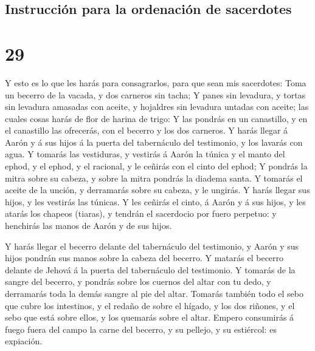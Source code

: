 \hypertarget{instrucciuxf3n-para-la-ordenaciuxf3n-de-sacerdotes}{%
\subsection{Instrucción para la ordenación de
sacerdotes}\label{instrucciuxf3n-para-la-ordenaciuxf3n-de-sacerdotes}}

\hypertarget{section-02-29}{%
\section{29}\label{section-02-29}}

 Y esto es lo que les harás para consagrarlos, para que
sean mis sacerdotes: Toma un becerro de la vacada, y dos carneros sin
tacha;  Y panes sin levadura, y tortas sin levadura
amasadas con aceite, y hojaldres sin levadura untadas con aceite; las
cuales cosas harás de flor de harina de trigo:  Y las
pondrás en un canastillo, y en el canastillo las ofrecerás, con el
becerro y los dos carneros.  Y harás llegar á Aarón y á
sus hijos á la puerta del tabernáculo del testimonio, y los lavarás con
agua.  Y tomarás las vestiduras, y vestirás á Aarón la
túnica y el manto del ephod, y el ephod, y el racional, y le ceñirás con
el cinto del ephod;  Y pondrás la mitra sobre su cabeza, y
sobre la mitra pondrás la diadema santa.  Y tomarás el
aceite de la unción, y derramarás sobre su cabeza, y le ungirás.
 Y harás llegar sus hijos, y les vestirás las túnicas.
 Y les ceñirás el cinto, á Aarón y á sus hijos, y les
atarás los chapeos (tiaras), y tendrán el sacerdocio por fuero perpetuo:
y henchirás las manos de Aarón y de sus hijos.

 Y harás llegar el becerro delante del tabernáculo del
testimonio, y Aarón y sus hijos pondrán sus manos sobre la cabeza del
becerro.  Y matarás el becerro delante de Jehová á la
puerta del tabernáculo del testimonio.  Y tomarás de la
sangre del becerro, y pondrás sobre los cuernos del altar con tu dedo, y
derramarás toda la demás sangre al pie del altar. 
Tomarás también todo el sebo que cubre los intestinos, y el redaño de
sobre el hígado, y los dos riñones, y el sebo que está sobre ellos, y
los quemarás sobre el altar.  Empero consumirás á fuego
fuera del campo la carne del becerro, y su pellejo, y su estiércol: es
expiación.

